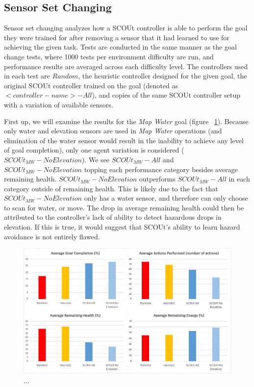 \subsection{Sensor Set Changing} \label{sec:sensor_change}
Sensor set changing analyzes how a SCOUt controller is able to perform the goal they were trained for after removing a sensor that it had learned to use for achieving the given task.
Tests are conducted in the same manner as the goal change tests, where 1000 tests per environment difficulty are run, and performance results are averaged across each difficulty level.
The controllers used in each test are $Random$, the heuristic controller designed for the given goal, the original SCOUt controller trained on the goal (denoted as $<controller-name> - All$), and copies of the same SCOUt controller setup with a variation of available sensors.

First up, we will examine the results for the \textit{Map Water} goal (figure ~\ref{fig:change_sensors_mapwater}).
Because only water and elevation sensors are used in \textit{Map Water} operations (and elimination of the water sensor would result in the inability to achieve any level of goal completion), only one agent variation is considered ($SCOUt_{MW} - No Elevation$).
We see $SCOUt_{MW} - All$ and $SCOUt_{MW} - No Elevation$ topping each performance category besides average remaining health.
$SCOUt_{MW} - No Elevation$ outperforms $SCOUt_{MW} - All$ in each category outside of remaining health.
This is likely due to the fact that $SCOUt_{MW} - No Elevation$ only has a water sensor, and therefore can only choose to scan for water, or move.
The drop in average remaining health could then be attributed to the controller's lack of ability to detect hazardous drops in elevation.
If this is true, it would suggest that SCOUt's ability to learn hazard avoidance is not entirely flawed.

\begin{figure}[H]
  \includegraphics[width=1.0\columnwidth]{Figures/Results/Experiment2/SensorChange/MapWater.JPG}
  \caption{...}
  \label{fig:change_sensors_mapwater}
\end{figure}

